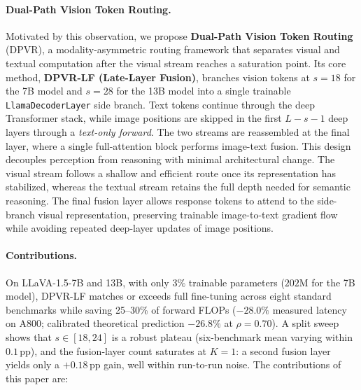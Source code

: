 \documentclass[a4paper,fleqn,review]{cas-sc}
\newcommand{\dpvr}{DPVR}
\newcommand{\dpvrlf}{DPVR-LF}
\begin{document}
\paragraph{Dual-Path Vision Token Routing.}
Motivated by this observation, we propose \textbf{Dual-Path Vision
Token Routing} (\dpvr{}), a modality-asymmetric routing framework
that separates visual and textual computation after the visual stream
reaches a saturation point. Its core method, \textbf{\dpvrlf{}
(Late-Layer Fusion)}, branches vision tokens at $s = 18$ for the 7B
model and $s = 28$ for the 13B model into a single trainable
\texttt{LlamaDecoderLayer} side branch. Text tokens continue through
the deep Transformer stack, while image positions are skipped in the
first $L - s - 1$ deep layers through a \emph{text-only forward}.
The two streams are reassembled at the final layer, where a single
full-attention block performs image-text fusion. This design
decouples perception from reasoning with minimal architectural
change. The visual stream follows a shallow and efficient route once
its representation has stabilized, whereas the textual stream retains
the full depth needed for semantic reasoning. The final fusion layer
allows response tokens to attend to the side-branch visual
representation, preserving trainable image-to-text gradient flow
while avoiding repeated deep-layer updates of image positions.

\paragraph{Contributions.}
On LLaVA-1.5-7B and 13B, with only $3\%$ trainable parameters
($202$M for the 7B model), \dpvrlf{} matches or exceeds full
fine-tuning across eight standard benchmarks while saving 25--30\% of
forward FLOPs ($-28.0\%$ measured latency on A800; calibrated
theoretical prediction $-26.8\%$ at $\rho = 0.70$). A split sweep
shows that $s \in [18, 24]$ is a robust plateau (six-benchmark mean
varying within $0.1$\,pp), and the fusion-layer count saturates at
$K = 1$: a second fusion layer yields only a $+0.18$\,pp gain, well
within run-to-run noise. The contributions of this paper are:
\end{document}
